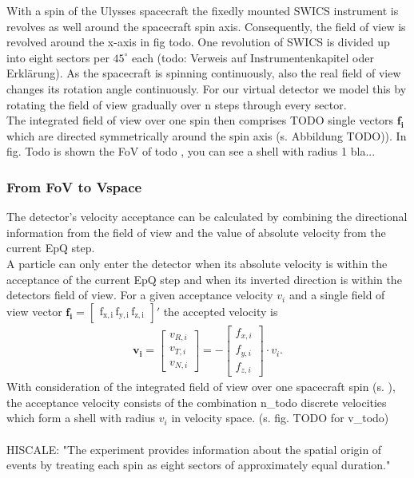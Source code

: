 With a spin of the Ulysses spacecraft the fixedly mounted SWICS instrument is revolves as well around the spacecraft spin axis. Consequently, the field of view is revolved around the x-axis in fig todo. One revolution of SWICS is divided up into eight sectors per $45^\circ$ each (todo: Verweis auf Instrumentenkapitel oder Erklärung). As the spacecraft is spinning continuously, also the real field of view changes its rotation angle continuously.
For our virtual detector we model this by rotating the field of view gradually over n steps through every sector.\\
The integrated field of view over one spin then comprises TODO single vectors $\mathrm{\mathbf{f_i}}$ which are directed symmetrically around the spin axis (s. Abbildung TODO)). In fig. Todo is shown the FoV of todo , you can see a shell with radius 1 bla...
\subsubsection{From FoV to Vspace}
The detector's velocity acceptance can be calculated by combining the directional information from the field of view and the value of absolute velocity from the current EpQ step. 
\\
A particle can only enter the detector when its absolute velocity is within the acceptance of the current EpQ step and when its inverted direction is within the detectors field of view. For a given acceptance velocity $v_i$ and a single field of view vector $\mathrm{\mathbf{f_i} = \begin{bmatrix}f_{x,i}\,f_{y,i}\,f_{z,i}\end{bmatrix}}'$ the accepted velocity is
\begin{align}
\mathbf{v_i} = \begin{bmatrix}v_{R,i}\\v_{T,i}\\v_{N,i}\end{bmatrix} = - \begin{bmatrix}f_{x,i}\\f_{y,i}\\f_{z,i}\end{bmatrix} \cdot v_i.
\label{eq:fov}
\end{align}
With consideration of the integrated field of view over one spacecraft spin (s. ), the acceptance velocity consists of the combination n\_todo discrete velocities which form a shell with radius $v_i$ in velocity space. (s. fig. TODO for v\_todo)
\\ \\
HISCALE: "The experiment provides information about the spatial origin of events by treating each spin as eight sectors of approximately equal duration." \\ \\ \\


